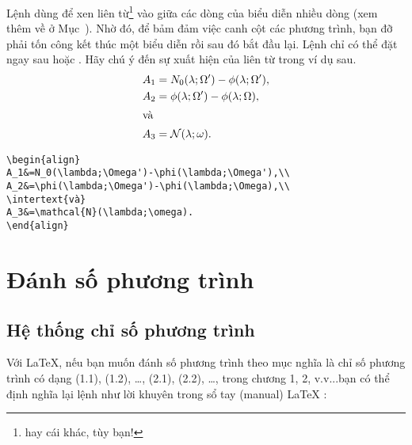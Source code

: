 Lệnh  dùng để xen liên từ\footnote{hay cái khác, tùy bạn!}
vào giữa các dòng của biểu diễn nhiều dòng (xem thêm về 
ở Mục~). Nhờ đó, để bảm đảm việc canh cột các phương trình,
bạn đỡ phải tốn công kết thúc một biểu diễn rồi sau đó bắt đầu lại.
Lệnh  chỉ có thể đặt ngay sau \cn{\\} hoặc \cn{\\*}.
Hãy chú ý đến sự xuất hiện của liên từ  trong ví dụ sau.
\begin{align}
A_1&=N_0(\lambda;\Omega')-\phi(\lambda;\Omega'),\\
A_2&=\phi(\lambda;\Omega')-\phi(\lambda;\Omega),\\
\intertext{và}
A_3&=\mathcal{N}(\lambda;\omega).
\end{align}
\begin{verbatim}
\begin{align}
A_1&=N_0(\lambda;\Omega')-\phi(\lambda;\Omega'),\\
A_2&=\phi(\lambda;\Omega')-\phi(\lambda;\Omega),\\
\intertext{và}
A_3&=\mathcal{N}(\lambda;\omega).
\end{align}
\end{verbatim}

\section{Đánh số phương trình}

\subsection{Hệ thống chỉ số phương trình}
Với \LaTeX{}, nếu bạn muốn đánh số phương trình theo mục\mdash
nghĩa là chỉ số phương trình có dạng (1.1), (1.2), \dots, (2.1), (2.2), \dots,
trong chương 1, 2, v.v...\mdash bạn có thể định nghĩa lại lệnh
 như lời khuyên trong sổ tay (manual) \LaTeX{} 
\cite[\S6.3, \S C.8.4]{lamport}:

